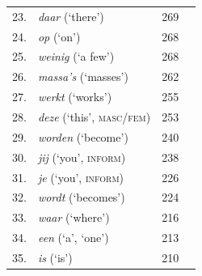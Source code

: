 \documentclass[11pt]{article}
\begin{document}
\begin{table}[htbp]
{\begin{tabular}[t]{@{}llll@{}}
23. & \textit{daar} (‘there’) & 269 \\
24. & \textit{op} (‘on’) & 268 \\
25. & \textit{weinig} (‘a few’) & 268 \\
26. & \textit{massa's} (‘masses’) & 262 \\
27. & \textit{werkt} (‘works’) & 255 \\
28. & \textit{deze} (‘this’, \textsc{masc/fem}) & 253 \\
29. & \textit{worden} (‘become’) & 240 \\
30. & \textit{jij} (‘you’, \textsc{inform}) & 238 \\
31. & \textit{je} (‘you’, \textsc{inform}) & 226 \\
32. & \textit{wordt} (‘becomes’) & 224 \\
33. & \textit{waar} (‘where’) & 216 \\
34. & \textit{een} (‘a’, ‘one’) & 213 \\
35. & \textit{is} (‘is’) & 210 \\ \hline
\end{tabular}
}
\end{table}
\end{document}
